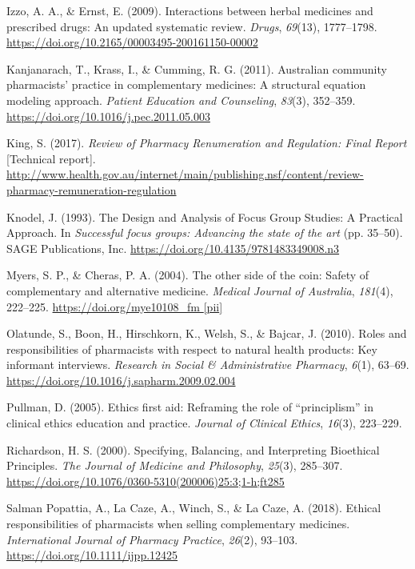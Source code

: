 \documentclass[12pt,]{article}
\begin{document}
\hypertarget{ref-Izzo2009}{}
Izzo, A. A., \& Ernst, E. (2009). Interactions between herbal medicines
and prescribed drugs: An updated systematic review. \emph{Drugs},
\emph{69}(13), 1777--1798.
\url{https://doi.org/10.2165/00003495-200161150-00002}

\hypertarget{ref-Kanjanarach2011}{}
Kanjanarach, T., Krass, I., \& Cumming, R. G. (2011). Australian
community pharmacists' practice in complementary medicines: A structural
equation modeling approach. \emph{Patient Education and Counseling},
\emph{83}(3), 352--359. \url{https://doi.org/10.1016/j.pec.2011.05.003}

\hypertarget{ref-King2017}{}
King, S. (2017). \emph{Review of Pharmacy Renumeration and Regulation:
Final Report} {[}Technical report{]}.
\url{http://www.health.gov.au/internet/main/publishing.nsf/content/review-pharmacy-remuneration-regulation}

\hypertarget{ref-Knodel1993}{}
Knodel, J. (1993). The Design and Analysis of Focus Group Studies: A
Practical Approach. In \emph{Successful focus groups: Advancing the
state of the art} (pp. 35--50). SAGE Publications, Inc.
\url{https://doi.org/10.4135/9781483349008.n3}

\hypertarget{ref-Myers2004}{}
Myers, S. P., \& Cheras, P. A. (2004). The other side of the coin:
Safety of complementary and alternative medicine. \emph{Medical Journal
of Australia}, \emph{181}(4), 222--225.
\href{https://doi.org/mye10108_fm\%20\%5Bpii\%5D}{https://doi.org/mye10108\_fm {[}pii{]}}

\hypertarget{ref-Olatunde2010}{}
Olatunde, S., Boon, H., Hirschkorn, K., Welsh, S., \& Bajcar, J. (2010).
Roles and responsibilities of pharmacists with respect to natural health
products: Key informant interviews. \emph{Research in Social \&
Administrative Pharmacy}, \emph{6}(1), 63--69.
\url{https://doi.org/10.1016/j.sapharm.2009.02.004}

\hypertarget{ref-Pullman2005}{}
Pullman, D. (2005). Ethics first aid: Reframing the role of
``principlism'' in clinical ethics education and practice. \emph{Journal
of Clinical Ethics}, \emph{16}(3), 223--229.

\hypertarget{ref-Richardson2000}{}
Richardson, H. S. (2000). Specifying, Balancing, and Interpreting
Bioethical Principles. \emph{The Journal of Medicine and Philosophy},
\emph{25}(3), 285--307.
\url{https://doi.org/10.1076/0360-5310(200006)25:3;1-h;ft285}

\hypertarget{ref-SalmanPopattia2018}{}
Salman Popattia, A., La Caze, A., Winch, S., \& La Caze, A. (2018).
Ethical responsibilities of pharmacists when selling complementary
medicines. \emph{International Journal of Pharmacy Practice},
\emph{26}(2), 93--103. \url{https://doi.org/10.1111/ijpp.12425}
\end{document}
